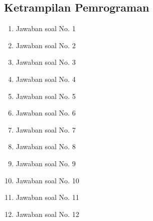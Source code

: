 \subsection{Ketrampilan Pemrograman}
\begin{enumerate}
	\item Jawaban soal No. 1
	
	
	\item Jawaban soal No. 2
	
	
	\item Jawaban soal No. 3
	
	
	\item Jawaban soal No. 4
	
	
	\item Jawaban soal No. 5
	
	
	\item Jawaban soal No. 6
	
	
	\item Jawaban soal No. 7
	
	
	\item Jawaban soal No. 8
	
	
	\item Jawaban soal No. 9
	
	
	\item Jawaban soal No. 10
	
	
	\item Jawaban soal No. 11
	
	
	\item Jawaban soal No. 12
	
	
\end{enumerate}

